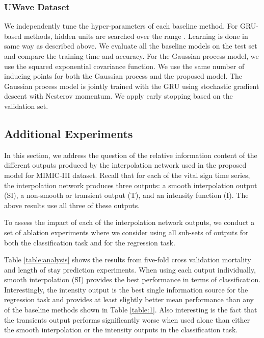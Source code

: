 \documentclass{article} \usepackage{iclr2019_conference,times}
\begin{document}
\subsubsection*{UWave Dataset} 
We independently tune the hyper-parameters of each baseline method. For GRU-based methods, hidden units are searched over the range . Learning is done in same way as described above.  We evaluate all the baseline models on the test set and compare the training time and accuracy. For the Gaussian process model, we use the squared exponential covariance function.  We use the same number of inducing points for both the Gaussian process and the proposed model. The Gaussian process model is jointly trained with the GRU using stochastic gradient descent with Nesterov momentum. We apply early stopping based on the validation set.

\subsection{Additional Experiments}
\label{ablation}

In this section, we address the question of the relative information content of the different 
outputs produced by the interpolation network used in the proposed model for MIMIC-III dataset.
Recall that for each of the  vital sign time series, the interpolation
network produces three outputs: a smooth interpolation output (SI), a non-smooth
or transient output (T), and an intensity function (I). The above results
use all three of these outputs. 

To assess the impact of each of the interpolation network outputs, we conduct a
set of ablation experiments where we consider using all sub-sets of outputs 
for both the classification task and for the regression task. 

Table \ref{table:analysis} shows the results from five-fold cross validation mortality and length of stay prediction experiments. When using each output individually, smooth 
interpolation (SI) provides the best performance in terms of classification. Interestingly,
the intensity output is the best single information source for the regression task
and provides at least slightly better mean performance than any of the baseline methods 
shown in Table \ref{table:1}. Also interesting is the fact that the transients output 
performs significantly worse when used alone than either the smooth interpolation 
or the intensity outputs in the classification task.  
\end{document}
